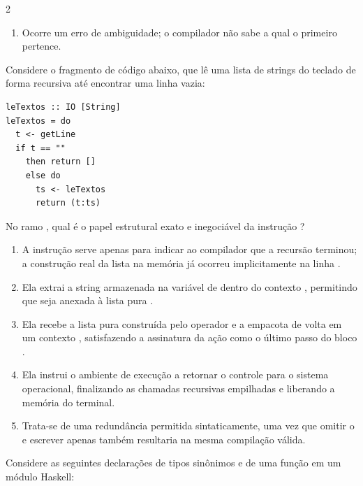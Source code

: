 \documentclass[a4paper,10pt,brazil]{article}
\begin{document}
\begin{multicols}{2}
\begin{enumerate}
  \item Ocorre um erro de ambiguidade; o compilador não sabe a qual  o primeiro  pertence.


\end{enumerate}

Considere o fragmento de código abaixo, que lê uma lista de strings do teclado de forma recursiva até encontrar uma linha vazia:

\begin{verbatim}
leTextos :: IO [String]
leTextos = do
  t <- getLine
  if t == "" 
    then return []
    else do
      ts <- leTextos
      return (t:ts)
\end{verbatim}

No ramo , qual é o papel estrutural exato e inegociável da instrução ?

\begin{enumerate}
  \item A instrução  serve apenas para indicar ao compilador que a recursão terminou; a construção real da lista na memória já ocorreu implicitamente na linha .

  \item Ela extrai a string armazenada na variável  de dentro do contexto , permitindo que seja anexada à lista pura .

  \item Ela recebe a lista pura construída pelo operador \haskellinline{(:)} e a empacota de volta em um contexto , satisfazendo a assinatura da ação como o último passo do bloco .

  \item Ela instrui o ambiente de execução a retornar o controle para o sistema operacional, finalizando as chamadas recursivas empilhadas e liberando a memória do terminal.

  \item Trata-se de uma redundância permitida sintaticamente, uma vez que omitir o  e escrever apenas  também resultaria na mesma compilação válida.


\end{enumerate}

Considere as seguintes declarações de tipos sinônimos e de uma função em um módulo Haskell:


\end{multicols}
\end{document}

